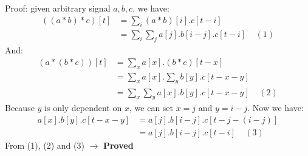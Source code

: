 \documentclass{article}
\begin{document}
Proof:  given arbitrary signal $a, b, c$, we have:
\begin{align*}
((a * b) * c)[t] &= \sum\limits_{i} (a*b)[i].c[t-i]\\
&= \sum\limits_{i}\sum\limits_{j}a[j].b[i-j].c[t-i]\ \ \ \ \ (1)
\end{align*}
And:
\begin{align*}
(a * (b * c))[t] &= \sum\limits_{x} a[x].(b*c)[t-x]\\
&= \sum\limits_{x} a[x].\sum\limits_{y}b[y].c[t-x-y]\\
&= \sum\limits_{x}\sum\limits_{y}a[x].b[y].c[t-x-y]\ \ \ \ \ (2)
\end{align*}
Because $y$ is only dependent on $x$, we can set $x = j$ and $y = i - j$. Now we have:
\begin{align*}
a[x].b[y].c[t-x-y] &= a[j].b[i-j].c[t-j-(i-j)]\\
&= a[j].b[i-j].c[t-i]\ \ \ \ \ (3)
\end{align*}
From (1), (2) and (3) $\to$ \textbf{Proved}
\end{document}
